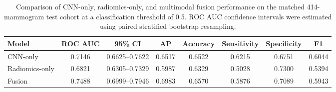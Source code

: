 \begin{table}[htbp]
    \centering
    \caption{Comparison of CNN-only, radiomics-only, and multimodal
    fusion performance on the matched 414-mammogram test cohort at a
    classification threshold of 0.5. ROC AUC confidence intervals were
    estimated using paired stratified bootstrap resampling.}
    \label{tab:rq1_final_model_comparison}
    \small
    \begin{tabular}{lccccccc}
        \toprule
        Model & ROC AUC & 95\% CI & AP & Accuracy &
        Sensitivity & Specificity & F1 \\
        \midrule
        CNN-only & 0.7146 & 0.6625--0.7622 & 0.6517 & 0.6522 & 0.6215 & 0.6751 & 0.6044 \\
        Radiomics-only & 0.6821 & 0.6305--0.7329 & 0.5987 & 0.6329 & 0.5028 & 0.7300 & 0.5394 \\
        Fusion & 0.7488 & 0.6999--0.7946 & 0.6983 & 0.6570 & 0.5876 & 0.7089 & 0.5943 \\
        \bottomrule
    \end{tabular}
\end{table}
